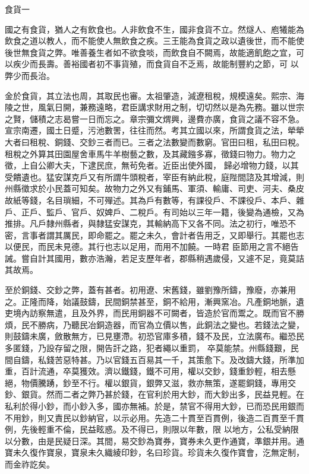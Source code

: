 
\begin{pinyinscope}

 食貨一



 國之有食貨，猶人之有飲食也。人非飲食不生，國非食貨不立。然燧人、庖犧能為飲食之道以教人，而不能使人無飲食之疾。三王能為食貨之政以遺後世，而不能使後世無食貨之弊。唯善養生者如不欲食啖，而飲食自不闕焉，故能適飢飽之宜，可以疾少而長壽。善裕國者初不事貨殖，而食貨自不乏焉，故能制豐約之節，可
 以弊少而長治。



 金於食貨，其立法也周，其取民也審。太祖肇造，減遼租稅，規模遠矣。熙宗、海陵之世，風氣日開，兼務遠略，君臣講求財用之制，切切然以是為先務。雖以世宗之賢，儲積之志曷嘗一日而忘之。章宗彌文煟興，邊費亦廣，食貨之議不容不急。宣宗南遷，國土日蹙，污池數罟，往往而然。考其立國以來，所謂食貨之法，犖犖大者曰租稅、銅錢、交鈔三者而已。三者之法數變而數窮。官田曰租，私田曰稅。租稅之外算其田園屋舍車馬牛羊樹藝之數，及其藏鏹多寡，徵錢曰物力。物力之徵，上自公卿大夫，下逮民庶，無茍免者。近臣出使外國，
 歸必增物力錢，以其受饋遺也。猛安謀克戶又有所謂牛頭稅者，宰臣有納此稅，庭陛間諮及其增減，則州縣徵求於小民蓋可知矣。故物力之外又有鋪馬、軍須、輸庸、司吏、河夫、桑皮故紙等錢，名目瑣細，不可殫述。其為戶有數等，有課役戶、不課役戶、本戶、雜戶、正戶、監戶、官戶、奴婢戶、二稅戶。有司始以三年一籍，後變為通檢，又為推排。凡戶隸州縣者，與隸猛安謀克，其輸納高下又各不同。法之初行，唯恐不密，言事者謂其厲民，即命罷之。罷之未久，會計者告用乏，又即舉行。其罷也志以便民，而民未見德。其行也志以足用，而用不加饒。一時君
 臣節用之言不絕告誡。嘗自計其國用，數亦浩瀚，若足支歷年者，郡縣稍遇歲侵，又遽不足，竟莫詰其故焉。



 至於銅錢、交鈔之弊，蓋有甚者。初用遼、宋舊錢，雖劉豫所鑄，豫廢，亦兼用之。正隆而降，始議鼓鑄，民間銅禁甚至，銅不給用，漸興窯冶。凡產銅地脈，遺吏境內訪察無遣，且及外界，而民用銅器不可闕者，皆造於官而鬻之。既而官不勝煩，民不勝病，乃聽民冶銅造器，而官為立價以售，此銅法之變也。若錢法之變，則鼓鑄未廣，斂散無方，已見壅滯。初恐官庫多積，錢不及民，立法廣布。繼恐民多匿錢，乃設存留之限，開告訐之路，犯者繩以重罰，
 卒莫能禁。州縣錢艱，民間自鑄，私錢苦惡特甚。乃以官錢五百易其一千，其策愈下。及改鑄大錢，所準加重，百計流通，卒莫獲效。濟以鐵錢，鐵不可用，權以交鈔，錢重鈔輕，相去懸絕，物價騰踴，鈔至不行。權以銀貨，銀弊又滋，救亦無策，遂罷銅錢，專用交鈔、銀貨。然而二者之弊乃甚於錢，在官利於用大鈔，而大鈔出多，民益見輕。在私利於得小鈔，而小鈔入多，國亦無補。於是，禁官不得用大鈔，已而恐民用銀而不用鈔，則又責民以鈔納官，以示必用。先造二十貫至百貫例，後造二百貫至千貫例，先後輕重不倫，民益眩惑。及不得已，則限以年數，限
 以地方，公私受納限以分數，由是民疑日深。其間，易交鈔為寶券，寶券未久更作通寶，準銀并用。通寶未久復作寶泉，寶泉未久織綾印鈔，名曰珍貨。珍貨未久復作寶會，汔無定制，而金祚訖矣。




\end{pinyinscope}
